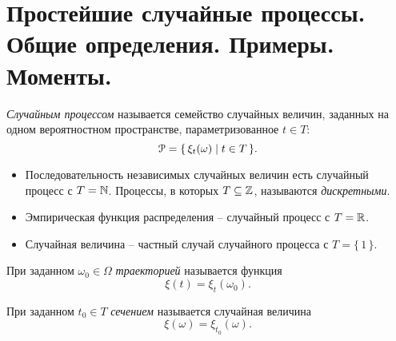 \section{Простейшие случайные процессы. Общие определения. Примеры. Моменты.} 

\begin{definition}
    \textit{Случайным процессом} называется семейство случайных величин,
    заданных на одном вероятностном пространстве, параметризованное $t \in T$:
    \[
        \mathcal{P} = \{\, \xi_t(\omega) \mid t \in T \,\}
    .\]
\end{definition}

\begin{example}
    \enewline
    \begin{itemize}
        \item Последовательность независимых случайных величин есть случайный
            процесс с $T = \mathbb{N}$. Процессы, в которых $T \subseteq \mathbb{Z}$, 
            называются \textit{дискретными}.
        \item Эмпирическая функция распределения -- случайный процесс с $T = \mathbb{R}$.
        \item Случайная величина -- частный случай случайного процесса с 
            $T = \{\,1\,\}$.
    \end{itemize}
\end{example}

\begin{definition}
    При заданном $\omega_0 \in \Omega$ \textit{траекторией} называется
    функция
    \[
        \xi(t) = \xi_t(\omega_0)
    .\]
\end{definition}

\begin{definition}
    При заданном $t_0 \in T$ \textit{сечением} называется случайная величина
    \[
        \xi(\omega) = \xi_{t_0}(\omega)
    .\]
\end{definition}


